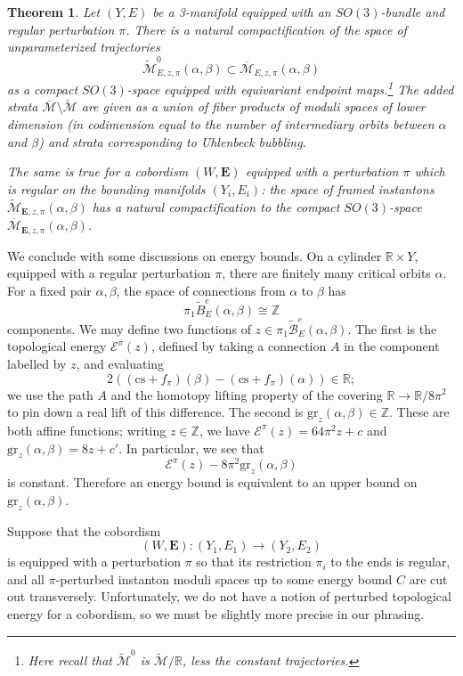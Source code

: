 \documentclass{memo-l}
\newtheorem{theorem}{Theorem}[chapter]
\theoremstyle{definition}
\theoremstyle{remark}
\numberwithin{section}{chapter}
\numberwithin{equation}{chapter}
\begin{document}
\begin{theorem}\label{comp}Let $(Y,E)$ be a 3-manifold equipped with an $SO(3)$-bundle and regular perturbation $\pi$. There is a natural compactification of the space of unparameterized trajectories $$\widetilde{\mathcal M}^0_{E,z,\pi}(\alpha,\beta) \subset \overline{\mathcal M}_{E,z,\pi}(\alpha,\beta)$$ as a compact $SO(3)$-space equipped with equivariant endpoint maps.\footnote{Here recall that $\widetilde{\mathcal M}^0$ is $\widetilde{\mathcal M}/\mathbb R$, less the constant trajectories.} The added strata $\overline{\mathcal M} \setminus \widetilde{\mathcal M}$ are given as a union of fiber products of moduli spaces of lower dimension (in codimension equal to the number of intermediary orbits between $\alpha$ and $\beta$) and strata corresponding to Uhlenbeck bubbling.

The same is true for a cobordism $(W,\mathbf{E})$ equipped with a perturbation $\pi$ which is regular on the bounding manifolds $(Y_i, E_i)$: the space of framed instantons $\widetilde{\mathcal M}_{\mathbf{E},z,\pi}(\alpha, \beta)$ has a natural compactification to the compact $SO(3)$-space $\overline{\mathcal M}_{\mathbf{E},z,\pi}(\alpha, \beta)$.
\end{theorem}

We conclude with some discussions on energy bounds. On a cylinder $\mathbb R \times Y$, equipped with a regular perturbation $\pi$, there are finitely many critical orbits $\alpha$. For a fixed pair $\alpha, \beta$, the space of connections from $\alpha$ to $\beta$ has
$$\pi_1 \widetilde B^e_E(\alpha, \beta) \cong \mathbb Z$$
components. We may define two functions of $z \in \pi_1 \widetilde{\mathcal B}^e_E(\alpha, \beta)$. The first is the topological energy $\mathcal E^\pi(z)$, defined by taking a connection $A$ in the component labelled by $z$, and evaluating $$2\left((\text{cs}+f_\pi)(\beta)-(\text{cs}+f_\pi)(\alpha)\right) \in \mathbb R;$$ we use the path $A$ and the homotopy lifting property of the covering $\mathbb R \to \mathbb R/8\pi^2$ to pin down a real lift of this difference. The second is $\text{gr}_z(\alpha, \beta) \in \mathbb Z$. These are both affine functions; writing $z \in \mathbb Z$, we have $\mathcal E^\pi(z) = 64\pi^2 z + c$ and $\text{gr}_z(\alpha, \beta) = 8z + c'$. In particular, we see that
$$\mathcal E^\pi(z) - 8\pi^2\text{gr}_z(\alpha, \beta)$$
is constant. Therefore an energy bound is equivalent to an upper bound on $\text{gr}_z(\alpha, \beta)$.

Suppose that the cobordism
$$(W,\mathbf{E}): (Y_1, E_1) \to (Y_2, E_2)$$
is equipped with a perturbation $\pi$ so that its restriction $\pi_i$ to the ends is regular, and all $\pi$-perturbed instanton moduli spaces up to some energy bound $C$ are cut out transversely. Unfortunately, we do not have a notion of perturbed topological energy for a cobordism, so we must be slightly more precise in our phrasing.
\end{document}
